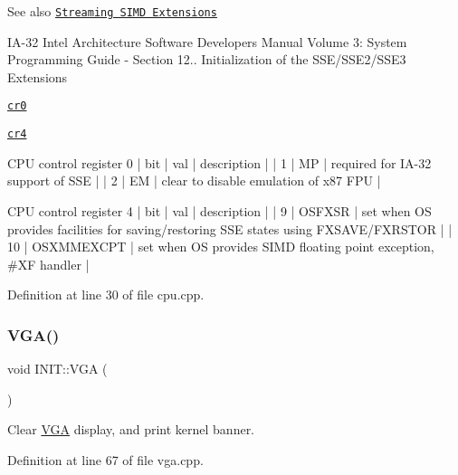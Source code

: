 \begin{DoxySeeAlso}{See also}
\href{https://en.wikipedia.org/wiki/Streaming_SIMD_Extensions}{\tt Streaming S\+I\+MD Extensions}

I\+A-\/32 Intel Architecture Software Developer\textquotesingle{}s Manual Volume 3\+: System Programming Guide -\/ Section 12.. Initialization of the S\+S\+E/\+S\+S\+E2/\+S\+S\+E3 Extensions 

\href{https://en.wikipedia.org/wiki/Control_register#CR0}{\tt cr0} 

\href{https://en.wikipedia.org/wiki/Control_register#CR4}{\tt cr4}
\end{DoxySeeAlso}
\begin{DoxyVerb}CPU control register 0
| bit | val | description                           |
|   1 |  MP | required for IA-32 support of SSE     |
|   2 |  EM | clear to disable emulation of x87 FPU |

CPU control register 4
| bit |        val | description                                                                          |
|   9 |     OSFXSR | set when OS provides facilities for saving/restoring SSE states using FXSAVE/FXRSTOR |
|  10 | OSXMMEXCPT | set when OS provides SIMD floating point exception, #XF handler                      |
\end{DoxyVerb}
 

Definition at line 30 of file cpu.\+cpp.

\mbox{\label{namespace_i_n_i_t_abae5789d80f8edd37455f3b167779654}} 
\subsubsection{\texorpdfstring{V\+G\+A()}{VGA()}}
{\footnotesize\ttfamily void I\+N\+I\+T\+::\+V\+GA (\begin{DoxyParamCaption}{ }\end{DoxyParamCaption})}



Clear \hyperlink{namespace_v_g_a}{V\+GA} display, and print kernel banner. 



Definition at line 67 of file vga.\+cpp.

